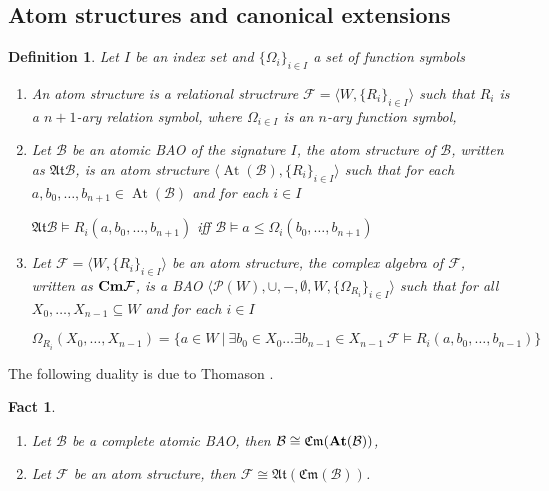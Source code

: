 \documentclass[a4paper]{article}
\theoremstyle{defin}
\newtheorem{defin}{Definition}
\theoremstyle{theorem}
\theoremstyle{prop}
\theoremstyle{lemma}
\theoremstyle{fact}
\newtheorem{fact}{Fact}
\theoremstyle{ex}
\theoremstyle{col}
\begin{document}
\subsection{Atom structures and canonical extensions}

\begin{defin}  Let $I$ be an index set and $\{ \Omega_i\}_{i \in I}$ a set of function symbols
\begin{enumerate}
  \item An atom structure is a relational structrure
  $\mathcal{F} = \langle W, \{ R_{i} \}_{i \in I} \rangle$
  such that $R_{i}$ is a $n+1$-ary relation symbol, where $\Omega_{i \in I}$ is an $n$-ary function symbol,
  \item Let $\mathcal{B}$ be an atomic BAO of the signature $I$,
the atom structure of $\mathcal{B}$, written as $\mathfrak{At} \mathcal{B}$, is an atom structure $\langle \operatorname{At}(\mathcal{B}), \{ R_{i}\}_{i \in I} \rangle$ such that for each
$a, b_0, \dots, b_{n + 1} \in \operatorname{At}(\mathcal{B})$ and for each $i \in I$
\begin{center}
  $\mathfrak{At} \mathcal{B} \models R_{i}(a,  b_0, \dots, b_{n + 1})$ iff $\mathcal{B} \models a \leq \Omega_{i}(b_0, \dots, b_{n + 1})$
\end{center}
\item Let $\mathcal{F} = \langle W, \{ R_{i} \}_{i \in I} \rangle$ be an atom structure, the complex algebra of $\mathcal{F}$, written as $\bf{Cm} \mathcal{F}$, is a BAO
$\langle \mathcal{P}(W), \cup, -, \emptyset, W, \{\Omega_{R_{i}}\}_{i \in I} \rangle$ such that
for all $X_0, \dots, X_{n - 1} \subseteq W$ and for each $i \in I$
\begin{center}
  $\Omega_{R_{i}}(X_0, \dots, X_{n - 1}) = \{ a \in W \: | \: \exists b_0 \in X_0 \dots \exists b_{n -1} \in X_{n - 1} \: \mathcal{F} \models R_{i}(a, b_0, \dots, b_{n - 1})\}$
\end{center}
\end{enumerate}
\end{defin}

The following duality is due to Thomason \cite{thomason1975categories}.

\begin{fact}
  $ $

  \begin{enumerate}
    \item Let $\mathcal{B}$ be a complete atomic BAO, then $\mathcal{B} \cong \mathfrak{Cm} (\bf{At}(\mathcal{B}))$,
    \item Let $\mathcal{F}$ be an atom structure, then $\mathcal{F} \cong \mathfrak{At}(\mathfrak{Cm}(\mathcal{B}))$.
  \end{enumerate}
\end{fact}
\end{document}
